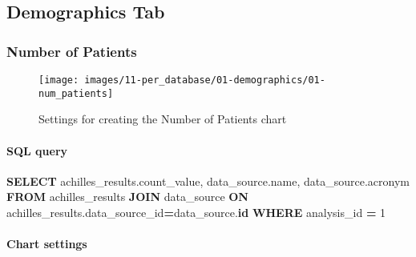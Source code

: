 \documentclass[
]{book}
\newenvironment{Shaded}{\begin{snugshade}}{\end{snugshade}}
\newcommand{\DecValTok}[1]{\textcolor[rgb]{0.00,0.00,0.81}{#1}}
\newcommand{\KeywordTok}[1]{\textcolor[rgb]{0.13,0.29,0.53}{\textbf{#1}}}
\newcommand{\NormalTok}[1]{#1}
\newcommand{\OperatorTok}[1]{\textcolor[rgb]{0.81,0.36,0.00}{\textbf{#1}}}
\begin{document}
\hypertarget{demographics-tab}{%
\subsection*{Demographics Tab}\label{demographics-tab}}

\hypertarget{number-of-patients}{%
\subsubsection*{Number of Patients}\label{number-of-patients}}

\begin{figure}
\texttt{[image: images/11-per\_database/01-demographics/01-num\_patients]} \caption{Settings for creating the Number of Patients chart}\label{fig:numPatients}
\end{figure}

\hypertarget{sql-query-1}{%
\paragraph*{SQL query}\label{sql-query-1}}

\begin{Shaded}
\begin{Highlighting}[]
\KeywordTok{SELECT}
\NormalTok{  achilles\_results.count\_value,}
\NormalTok{  data\_source.name,}
\NormalTok{  data\_source.acronym}
\KeywordTok{FROM}\NormalTok{ achilles\_results}
\KeywordTok{JOIN}\NormalTok{ data\_source }\KeywordTok{ON}\NormalTok{ achilles\_results.data\_source\_id}\OperatorTok{=}\NormalTok{data\_source.}\KeywordTok{id}
\KeywordTok{WHERE}\NormalTok{ analysis\_id }\OperatorTok{=} \DecValTok{1}
\end{Highlighting}
\end{Shaded}

\hypertarget{chart-settings-1}{%
\paragraph*{Chart settings}\label{chart-settings-1}}
\end{document}
